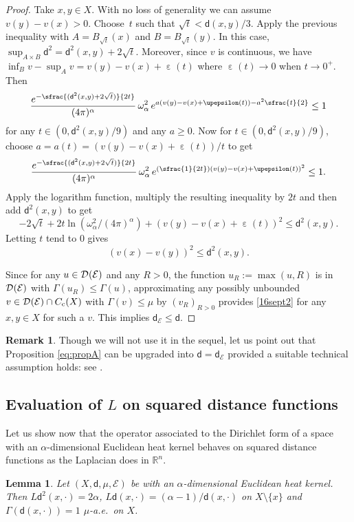 \documentclass[10pt]{amsart}
\newcommand{\psfrac}[2]{\sfrac{(#1)}{#2}}
\newcommand{\Psfrac}[2]{(\sfrac{#1}{#2})}
\newcommand{\rmc}{\mathrm{c}}
\let\backslash\setminus
\newcommand{\NoChangel}[1]{%
\expandafter\let\csname old\string#1\endcsname=#1
\let#1=\relax
\newcommand{#1}{\mathcode`l="716C\csname old\string#1\endcsname\mathcode`l="7160 }%
}
\theoremstyle{plain}
\newtheorem{lemma}[theorem]{Lemma}
\theoremstyle{definition}
\newtheorem{remark}[theorem]{Remark}
\newcommand{\setR}{\mathbb{R}}
\newcommand{\cE}{\mathcal{E}}
\newcommand{\cD}{\mathcal{D}}
\let\eps\upepsilon
\newcommand{\loc}{\mathrm{loc}}\NoChangel{\loc}
\newcommand{\dist}{\mathsf{d}}
\begin{document}
\begin{proof}
Take $x,y \in X$. With no loss of generality we can assume $v(y)-v(x)>0$. Choose~$t$ such that $\sqrt{t}<\dist(x,y)/3$. Apply the previous inequality with $A=B_{\sqrt{t}}(x)$ and $B=B_{\sqrt{t}}(y)$. In this case, $\sup_{A\times B} \dist^2 = \dist^2(x,y) + 2 \sqrt{t}$. Moreover, since $v$ is continuous, we have $\inf_B v - \sup_A v = v(y)-v(x) + \eps(t)$ where $\eps(t)\to 0$ when $t \to 0^+$. Then
\[
\frac{e^{-\psfrac{\dist^2(x,y) + 2\sqrt{t}}{2t}}}{(4\pi)^\alpha}\, \omega_\alpha^2\, e^{a (v(y)-v(x) + \eps(t)) - a^2 \sfrac{t}{2}} \le 1
\]
for any $t \in (0,\dist^2(x,y)/9)$ and any $a \ge 0$. Now for $t \in (0,\dist^2(x,y)/9)$, choose $a=a(t)=(v(y)-v(x) + \eps(t))/t$ to get
\[
\frac{e^{-\psfrac{\dist^2(x,y) + 2\sqrt{t}}{2t}}}{(4\pi)^\alpha}\, \omega_\alpha^2\, e^{\Psfrac{1}{2t}(v(y)-v(x) + \eps(t))^2} \le 1.
\]
Apply the logarithm function, multiply the resulting inequality by $2t$ and then add $\dist^2(x,y)$ to get
\[
-2\sqrt{t} + 2t \ln(\omega_\alpha^2/(4\pi)^\alpha) + (v(y)-v(x) + \eps(t))^2 \le \dist^2(x,y).
\]
Letting $t$ tend to $0$ gives
\begin{equation}\label{16sept2}
(v(x)-v(y))^2 \le \dist^2(x,y).
\end{equation}

Since for any $u \in \cD_{\loc}(\cE)$ and any $R>0$, the function $u_R:=\max(u,R)$ is in $\cD_{\loc}(\cE)$ with $\Gamma(u_R)\le \Gamma(u)$, approximating any possibly unbounded $v \in \cD_{\loc}(\cE)\cap C_\rmc(X)$ with $\Gamma(v) \le \mu$ by $(v_R)_{R>0}$ provides \eqref{16sept2} for any $x,y \in X$ for such a $v$. This implies $\dist_\cE \le \dist$.
\end{proof}

\begin{remark}
Though we will not use it in the sequel, let us point out that Proposition \ref{eq:propA} can be upgraded into $\dist=\dist_\cE$ provided a suitable technical assumption holds: see \cite[Th.\,2.5\,(I)]{terElstRobinsonSikora}.
\end{remark}

\subsection{Evaluation of $L$ on squared distance functions}

Let us show now that the operator associated to the Dirichlet form of a space with an $\alpha$-dimensional Euclidean heat kernel behaves on squared distance functions as the Laplacian does in $\setR^n$.

\begin{lemma}\label{lem:Ld^2}
Let $(X,\dist,\mu,\cE)$ be with an $\alpha$-dimensional Euclidean heat kernel. Then $L\dist^2(x,\cdot)=2\alpha$, $L\dist(x,\cdot)=(\alpha-1)/\dist(x,\cdot)$ on $X\backslash \{x\}$ and $\Gamma(\dist(x,\cdot))=1$ $\mu$-a.e.\ on $X$.
\end{lemma}
\end{document}
